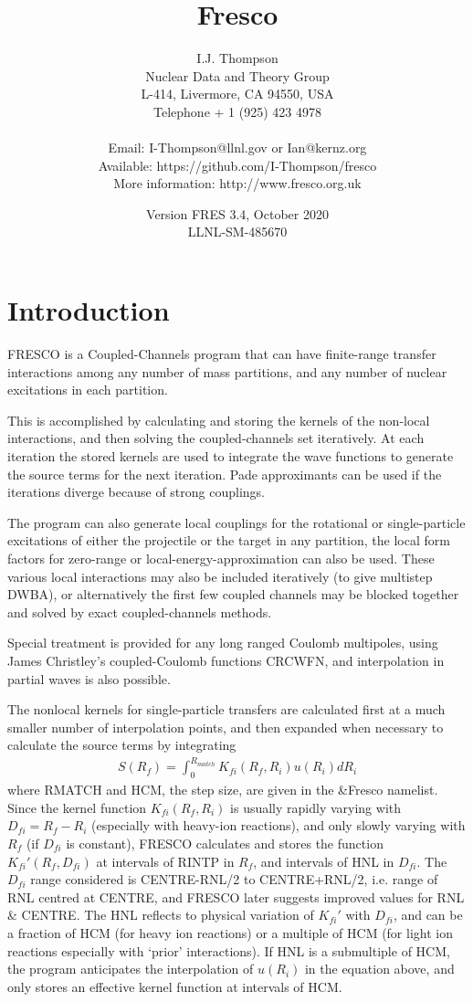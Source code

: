 \documentclass[11pt]{article}
\title{\Huge Fresco}
\date{Version FRES 3.4, October 2020\\  LLNL-SM-485670}
\author{I.J. Thompson
%
\\Nuclear Data and Theory Group
\\ L-414,
 Livermore, CA 94550, USA
\\Telephone + 1 (925) 423 4978
\\ %
\\Email: I-Thompson@llnl.gov or Ian@kernz.org
\\Available: https://github.com/I-Thompson/fresco
\\More information: http://www.fresco.org.uk }
\newcommand{\beqn}{\begin{eqnarray}}
\newcommand{\eeqn}{\end{eqnarray}}
\begin{document}
\maketitle
\tableofcontents
\newpage
\section{Introduction}

\parskip 5pt
\parindent 10pt

FRESCO is a Coupled-Channels program that can have finite-range
transfer interactions among any number of mass partitions, and any
number of nuclear excitations in each partition.

This is accomplished by calculating and storing the kernels of the
non-local interactions, and then solving the coupled-channels set
iteratively.
At each iteration the stored kernels are used to integrate the wave
functions to generate the source terms for the next iteration.
Pade approximants can be used if the iterations diverge because of
strong couplings.

The program can also generate local couplings for the rotational
or single-particle excitations of either the projectile or the
target in any partition,
the local form factors for zero-range or local-energy-approximation
can also be used.
These various local interactions may also be included iteratively
(to give multistep DWBA), or alternatively the first few coupled
channels may be blocked together and solved by exact coupled-channels
methods.

Special treatment is provided for any long ranged Coulomb multipoles,
using James Christley's coupled-Coulomb functions CRCWFN,
and interpolation in partial waves is also possible.

The nonlocal kernels for single-particle transfers are calculated first
at a much smaller number of interpolation points,
and then expanded when necessary to calculate the source terms by
integrating
\beqn
S(R _ f ) = \int _ 0 ^ {R _ {match}}
                K _ {fi} (R _ f , R _ i ) u(R _ i ) dR _ i
\eeqn
where RMATCH and HCM, the step size, are given in the \&Fresco namelist.
Since the kernel function $K_{fi}(R_f,R_i)$ is usually rapidly varying with
$D_{fi} = R_{f} - R_{i}$ (especially with heavy-ion reactions), and only slowly
varying with $R_{f}$ (if $D_{fi}$ is constant),  FRESCO calculates and stores
the function $K_{fi}'(R_{f},D_{fi})$ at intervals of RINTP in $R_{f}$,
and intervals of HNL in $D_{fi}$. The $D_{fi}$ range considered is
CENTRE-RNL/2 to CENTRE+RNL/2, i.e. range of RNL centred at CENTRE,
and FRESCO later suggests improved values for RNL \& CENTRE.
The HNL reflects to physical variation of $K_{fi}'$ with $D_{fi}$, and can be
a fraction of HCM (for heavy ion reactions) or a multiple of HCM
(for light ion reactions especially with `prior' interactions).
If HNL is a submultiple of HCM, the program anticipates the interpolation
of $u(R_{i})$ in the equation above, and only stores an effective kernel
function at intervals of HCM.
\end{document}
